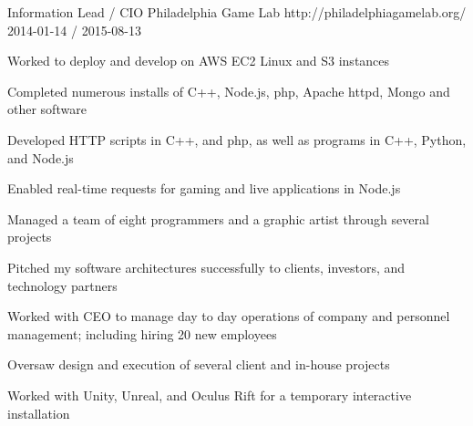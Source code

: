 \begin{cventries}
  \cventry
    {Information Lead / CIO}
    {Philadelphia Game Lab}
    {http://philadelphiagamelab.org/}
    {2014-01-14 / 2015-08-13}
    {
          \begin{cvitems}
                \item{Worked to deploy and develop on AWS EC2 Linux and S3 instances}
                    \begin{cvitemssub}
                        \item{Completed numerous installs of C++, Node.js, php, Apache httpd, Mongo and other software}
                        \item{Developed HTTP scripts in C++, and php, as well as programs in C++, Python, and Node.js}
                        \item{Enabled real-time requests for gaming and live applications in Node.js}
                    \end{cvitemssub}
                \item{Managed a team of eight programmers and a graphic artist through several projects}
                \item{Pitched my software architectures successfully to clients, investors, and technology partners}
                \item{Worked with CEO to manage day to day operations of company and personnel management; including hiring 20 new employees}
                \item{Oversaw design and execution of several client and in-house projects}
                \item{Worked with Unity, Unreal, and Oculus Rift for a temporary interactive installation}
          \end{cvitems}
    }
 

\end{cventries}
